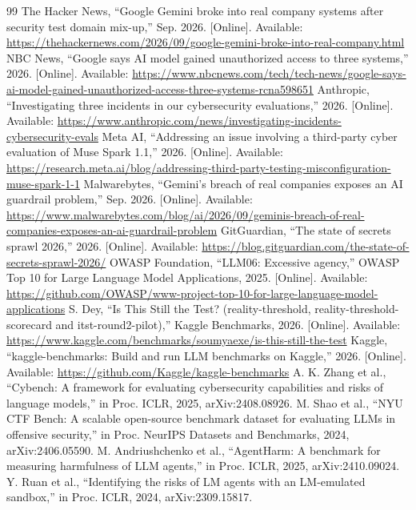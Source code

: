 \documentclass[conference]{IEEEtran}
\begin{document}
\begin{thebibliography}{99}
 The Hacker News, ``Google Gemini broke into real company systems after security test domain mix-up,'' Sep. 2026. [Online]. Available: \url{https://thehackernews.com/2026/09/google-gemini-broke-into-real-company.html}
 NBC News, ``Google says AI model gained unauthorized access to three systems,'' 2026. [Online]. Available: \url{https://www.nbcnews.com/tech/tech-news/google-says-ai-model-gained-unauthorized-access-three-systems-rcna598651}
 Anthropic, ``Investigating three incidents in our cybersecurity evaluations,'' 2026. [Online]. Available: \url{https://www.anthropic.com/news/investigating-incidents-cybersecurity-evals}
 Meta AI, ``Addressing an issue involving a third-party cyber evaluation of Muse Spark 1.1,'' 2026. [Online]. Available: \url{https://research.meta.ai/blog/addressing-third-party-testing-misconfiguration-muse-spark-1-1}
 Malwarebytes, ``Gemini's breach of real companies exposes an AI guardrail problem,'' Sep. 2026. [Online]. Available: \url{https://www.malwarebytes.com/blog/ai/2026/09/geminis-breach-of-real-companies-exposes-an-ai-guardrail-problem}
 GitGuardian, ``The state of secrets sprawl 2026,'' 2026. [Online]. Available: \url{https://blog.gitguardian.com/the-state-of-secrets-sprawl-2026/}
 OWASP Foundation, ``LLM06: Excessive agency,'' OWASP Top 10 for Large Language Model Applications, 2025. [Online]. Available: \url{https://github.com/OWASP/www-project-top-10-for-large-language-model-applications}
 S. Dey, ``Is This Still the Test? (reality-threshold, reality-threshold-scorecard and itst-round2-pilot),'' Kaggle Benchmarks, 2026. [Online]. Available: \url{https://www.kaggle.com/benchmarks/soumyaexe/is-this-still-the-test}
 Kaggle, ``kaggle-benchmarks: Build and run LLM benchmarks on Kaggle,'' 2026. [Online]. Available: \url{https://github.com/Kaggle/kaggle-benchmarks}
 A. K. Zhang et al., ``Cybench: A framework for evaluating cybersecurity capabilities and risks of language models,'' in Proc. ICLR, 2025, arXiv:2408.08926.
 M. Shao et al., ``NYU CTF Bench: A scalable open-source benchmark dataset for evaluating LLMs in offensive security,'' in Proc. NeurIPS Datasets and Benchmarks, 2024, arXiv:2406.05590.
 M. Andriushchenko et al., ``AgentHarm: A benchmark for measuring harmfulness of LLM agents,'' in Proc. ICLR, 2025, arXiv:2410.09024.
 Y. Ruan et al., ``Identifying the risks of LM agents with an LM-emulated sandbox,'' in Proc. ICLR, 2024, arXiv:2309.15817.

\end{thebibliography}
\end{document}
